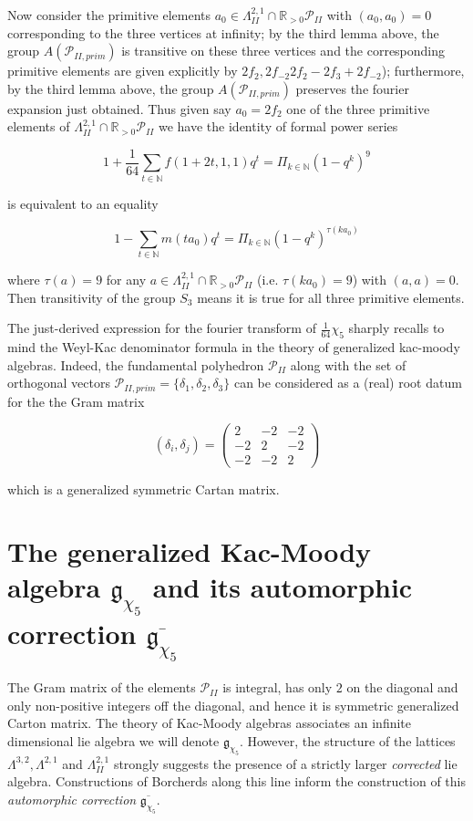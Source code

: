 \documentclass[9pt]{amsart} \usepackage[utf8]{inputenc}
\newcommand{\N}{\mathbb{N}}
\newcommand{\R}{\mathbb{R}} \newcommand{\La}{\Lambda}
\newcommand{\Poly}{\mathcal{P}}
\begin{document}
Now consider the primitive elements $a_0 \in \La^{2,1}_{II} \cap \R_{>0}
\Poly_{II}$ with $(a_0,a_0) = 0$ corresponding to the three vertices at
infinity; by the third lemma above, the group $A(\Poly_{II,prim})$ is
transitive on these three vertices and the corresponding primitive
elements are given explicitly by $2f_2,
2f_{-2} 2f_2 - 2f_3 + 2 f_{-2}$); furthermore, by the third lemma above, the group
$A(\Poly_{II,prim})$ preserves the fourier expansion just obtained. Thus
given say $a_0 = 2 f_2$ one of the three primitive elements of
$\La^{2,1}_{II} \cap \R_{>0}\Poly_{II}$ we have the identity of formal
power series

$$1 + \frac{1}{64} \sum_{t \in \N} f(1 + 2t, 1, 1)q^t = \Pi_{k\in \N} (1
- q^k)^9$$

is equivalent to an equality

$$ 1 - \sum_{t \in \N} m(t a_0) q^t = \Pi_{k\in \N}
(1 - q^k)^{\tau(k a_0)}$$

where $\tau(a) = 9$ for any  $a \in \La^{2,1}_{II} \cap \R_{>0}
\Poly_{II}$ (i.e. $\tau(k a_0) = 9$) with $(a,a) = 0$. Then transitivity
of the group $S_3$ means it is true for all three primitive elements.


The just-derived expression for the fourier transform of $\frac{1}{64}
\chi_5$ sharply recalls to mind the Weyl-Kac denominator
formula in the theory of generalized
kac-moody algebras. Indeed, the fundamental polyhedron
$\Poly_{II}$ along with the set of orthogonal vectors $\Poly_{II,prim} =
\{\delta_1,\delta_2,\delta_3\}$ can be considered as a (real) root datum for
the the Gram matrix

$$(\delta_i,\delta_j) = \begin{pmatrix}2 & -2 & -2\\-2 & 2 & -2\\-2 & -2
& 2\end{pmatrix}$$

which is a generalized symmetric Cartan matrix.

\section{The generalized Kac-Moody algebra $\mathfrak{g}_{\chi_5}$ and
its automorphic correction $\overline{\mathfrak{g}_{\chi_5}}$}

The Gram matrix of the elements $\Poly_{II}$ is integral, has only $2$
on the diagonal and only non-positive integers off the diagonal, and
hence it is symmetric generalized Carton matrix. The theory of Kac-Moody
algebras associates an infinite dimensional lie algebra we will denote
$\mathfrak{g}_{\chi_5}$. However, the structure of the lattices
$\La^{3,2}, \La^{2,1}$ and $\La^{2,1}_{II}$ strongly suggests the
presence of a strictly larger \textit{corrected} lie algebra.
Constructions of Borcherds along this line inform the construction of
this \textit{automorphic correction} $\overline{\mathfrak{g}_{\chi_5}}$.
\end{document}
